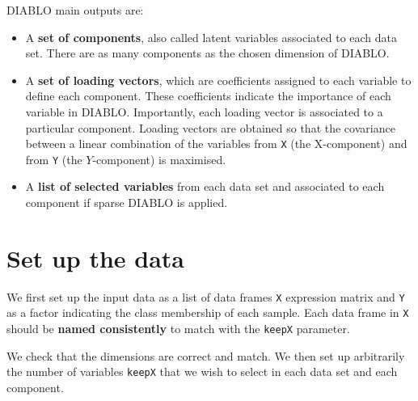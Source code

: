 \documentclass[]{book}
\newenvironment{Shaded}{\begin{snugshade}}{\end{snugshade}}
\newcommand{\CommentTok}[1]{\textcolor[rgb]{0.56,0.35,0.01}{\textit{#1}}}
\newcommand{\DataTypeTok}[1]{\textcolor[rgb]{0.13,0.29,0.53}{#1}}
\newcommand{\KeywordTok}[1]{\textcolor[rgb]{0.13,0.29,0.53}{\textbf{#1}}}
\newcommand{\NormalTok}[1]{#1}
\newcommand{\OperatorTok}[1]{\textcolor[rgb]{0.81,0.36,0.00}{\textbf{#1}}}
\newcommand{\StringTok}[1]{\textcolor[rgb]{0.31,0.60,0.02}{#1}}
\begin{document}
DIABLO main outputs are:

\begin{itemize}
\item
  A \textbf{set of components}, also called latent variables associated to each data set. There are as many components as the chosen dimension of DIABLO.
\item
  A \textbf{set of loading vectors}, which are coefficients assigned to each variable to define each component. These coefficients indicate the importance of each variable in DIABLO. Importantly, each loading vector is associated to a particular component. Loading vectors are obtained so that the covariance between a linear combination of the variables from \texttt{X} (the X-component) and from \texttt{Y} (the \(Y\)-component) is maximised.
\item
  A \textbf{list of selected variables} from each data set and associated to each component if sparse DIABLO is applied.
\end{itemize}

\hypertarget{set-up-the-data-2}{%
\section{Set up the data}\label{set-up-the-data-2}}

We first set up the input data as a list of data frames \texttt{X} expression matrix and \texttt{Y} as a factor indicating the class membership of each sample. Each data frame in \texttt{X} should be \textbf{named consistently} to match with the \texttt{keepX} parameter.

We check that the dimensions are correct and match. We then set up arbitrarily the number of variables \texttt{keepX} that we wish to select in each data set and each component.

\begin{Shaded}
\end{Shaded}
\end{document}
